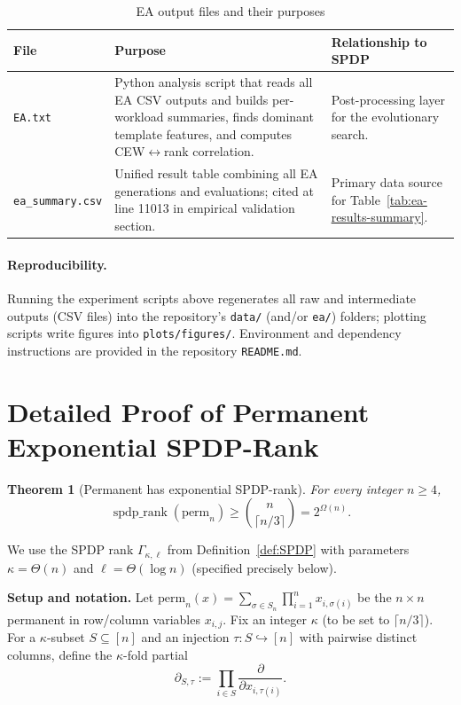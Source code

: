 \documentclass[12pt]{article}
\newtheorem{theorem}{Theorem}
\theoremstyle{definition}
\theoremstyle{definition}
\theoremstyle{remark}
\theoremstyle{remark}
\begin{document}
\begin{table}[h]
\centering
\footnotesize
\begin{tabular}{p{4.5cm}p{5cm}p{4.5cm}}
\toprule
\textbf{File} & \textbf{Purpose} & \textbf{Relationship to SPDP} \\
\midrule
\texttt{EA.txt} & Python analysis script that reads all EA CSV outputs and builds per-workload summaries, finds dominant template features, and computes CEW$\leftrightarrow$rank correlation. & Post-processing layer for the evolutionary search. \\
\addlinespace
\texttt{ea\_summary.csv} & Unified result table combining all EA generations and evaluations; cited at line 11013 in empirical validation section. & Primary data source for Table~\ref{tab:ea-results-summary}. \\
\bottomrule
\end{tabular}
\caption{EA output files and their purposes}
\label{tab:ea-files}
\end{table}

\paragraph{Reproducibility.}
Running the experiment scripts above regenerates all raw and intermediate outputs (CSV files) into the repository's \texttt{data/} (and/or \texttt{ea/}) folders; plotting scripts write figures into \texttt{plots/figures/}. Environment and dependency instructions are provided in the repository \texttt{README.md}.


\section{Detailed Proof of Permanent Exponential SPDP-Rank}

\begin{theorem}[Permanent has exponential SPDP-rank]\label{thm:perm-exp-rank-appendix}\label{thm:perm-exp-spdp}
For every integer $n \geq 4$,
\[
\operatorname{spdp\_rank}(\mathrm{perm}_n) \geq \binom{n}{\lceil n/3 \rceil} = 2^{\Omega(n)}.
\]
\end{theorem}

We use the SPDP rank $\Gamma_{\kappa,\ell}$ from Definition~\ref{def:SPDP} with parameters
$\kappa=\Theta(n)$ and $\ell=\Theta(\log n)$ (specified precisely below).


\textbf{Setup and notation.}
Let $\mathrm{perm}_n(x) = \sum_{\sigma \in S_n} \prod_{i=1}^n x_{i,\sigma(i)}$ be the $n \times n$ permanent in row/column variables $x_{i,j}$.
Fix an integer $\kappa$ (to be set to $\lceil n/3 \rceil$).
For a $\kappa$-subset $S \subseteq [n]$ and an injection $\tau : S \hookrightarrow [n]$ with pairwise distinct columns, define the $\kappa$-fold partial
\[
\partial_{S,\tau} := \prod_{i \in S} \frac{\partial}{\partial x_{i,\tau(i)}}.
\]
\end{document}
